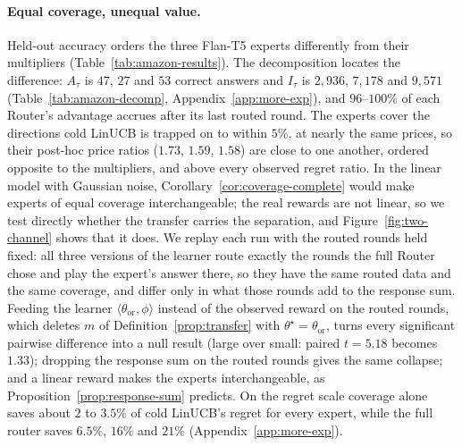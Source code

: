 \documentclass{article}
\theoremstyle{definition}
\theoremstyle{remark}
\theoremstyle{remark}
\begin{document}
\paragraph{Equal coverage, unequal value.}
Held-out accuracy orders the three Flan-T5 experts differently from their
multipliers (Table~\ref{tab:amazon-results}). The decomposition locates the difference:
$A_\tau$ is $47$, $27$ and $53$ correct answers and $I_\tau$ is $2{,}936$,
$7{,}178$ and $9{,}571$ (Table~\ref{tab:amazon-decomp},
Appendix~\ref{app:more-exp}), and $96$--$100\%$ of
each Router's advantage accrues after its last routed round. The experts
cover the directions cold LinUCB is trapped on to within $5\%$, at nearly the
same prices, so their post-hoc price ratios ($1.73$, $1.59$, $1.58$) are close
to one another, ordered opposite to the multipliers, and above every observed
regret ratio. In the linear model with Gaussian noise,
Corollary~\ref{cor:coverage-complete} would make experts of equal coverage
interchangeable; the real rewards are not linear, so we test directly whether
the transfer carries the separation, and Figure~\ref{fig:two-channel} shows
that it does. We replay each run with the routed rounds held fixed: all three
versions of the learner route exactly the rounds the full Router chose and
play the expert's answer there, so they have the same routed data and the same
coverage, and differ only in what those rounds add to the response sum.
Feeding the learner $\langle\theta_{\mathrm{or}},\phi\rangle$ instead of the
observed reward on the routed rounds, which deletes $m$ of
Definition~\ref{prop:transfer} with $\theta^\star=\theta_{\mathrm{or}}$, turns
every significant pairwise difference into a null result (large over small:
paired $t=5.18$ becomes $1.33$); dropping the response sum on the routed
rounds gives the same collapse; and a linear reward makes the experts
interchangeable, as Proposition~\ref{prop:response-sum} predicts. On the
regret scale coverage alone saves about $2$ to $3.5\%$ of cold LinUCB's
regret for every expert, while the full router saves $6.5\%$, $16\%$ and
$21\%$ (Appendix~\ref{app:more-exp}).
\end{document}

